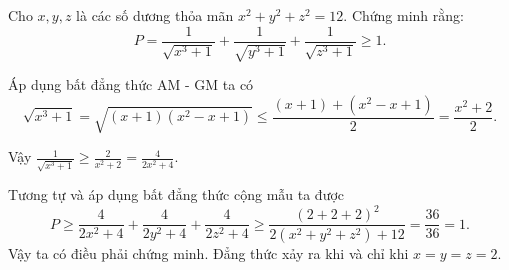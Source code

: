 \begin{problem}
	Cho $x, y, z$ là các số dương thỏa mãn $x^2 + y^2 + z^2 = 12$. Chứng minh rằng:
	$$
		P = \frac{1}{\sqrt{x^3 + 1}} + \frac{1}{\sqrt{y^3 + 1}} + \frac{1}{\sqrt{z^3 + 1}} \ge 1.
	$$
	\solution

	Áp dụng bất đẳng thức AM - GM ta có
	\[
		\sqrt{x^3 + 1} = \sqrt{(x + 1)(x^2 - x + 1)} \le \frac{(x + 1) + (x^2 - x + 1)}{2} = \frac{x^2 + 2}{2}.
	\]

	Vậy $\displaystyle \frac{1}{\sqrt{x^3 + 1}} \ge \frac{2}{x^2 + 2} = \frac{4}{2x^2 + 4}$.

	Tương tự và áp dụng bất đẳng thức cộng mẫu ta được
	$$
		P \ge \frac{4}{2x^2 + 4} + \frac{4}{2y^2 + 4} + \frac{4}{2z^2 + 4} \ge \frac{(2 + 2 + 2)^2}{
		2(x^2 + y^2 + z^2) + 12} = \frac{36}{36} = 1.
	$$
	Vậy ta có điều phải chứng minh. Đẳng thức xảy ra khi và chỉ khi $x = y = z = 2$.

\end{problem}